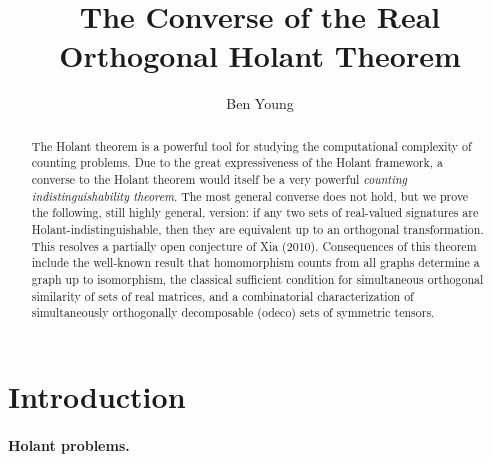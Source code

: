 \documentclass{article}
\author{Ben Young}\date{}
\title{The Converse of the Real Orthogonal Holant Theorem}
\begin{document}
\maketitle

\begin{abstract}
The Holant theorem is a powerful tool for studying the computational complexity of
counting problems. Due to the great expressiveness of the Holant framework,
a converse to the Holant theorem would itself be a very powerful 
\emph{counting indistinguishability theorem}. The most general converse does not hold, but we prove
the following, still highly general, version:
if any two sets of real-valued signatures are Holant-indistinguishable, then they are equivalent 
up to an orthogonal transformation. This resolves a partially open conjecture of Xia (2010).
Consequences of this theorem include the well-known result that homomorphism counts from all graphs
determine a graph up to isomorphism, the classical sufficient condition for simultaneous orthogonal
similarity of sets of real matrices,
and a combinatorial characterization of simultaneously orthogonally decomposable (odeco) sets of 
symmetric tensors.
\end{abstract}


\section{Introduction}
\paragraph{Holant problems.}
\end{document}
